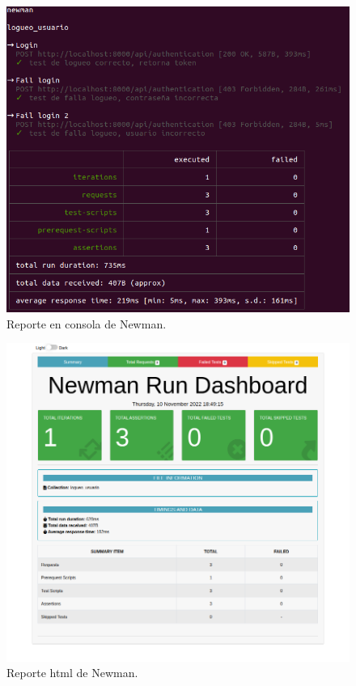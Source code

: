 \begin{figure}[ht]
	\centering
	\includegraphics[scale=.40]{./Figures/newman-1.png}
	\caption{Reporte en consola de Newman.}
	\label{fig:reporte cli Newman}
\end{figure}


\begin{figure}[ht]
	\centering
	\includegraphics[scale=.40]{./Figures/newman-2.png}
	\caption{Reporte html de Newman.}
	\label{fig:reporte html Newman}
\end{figure}

